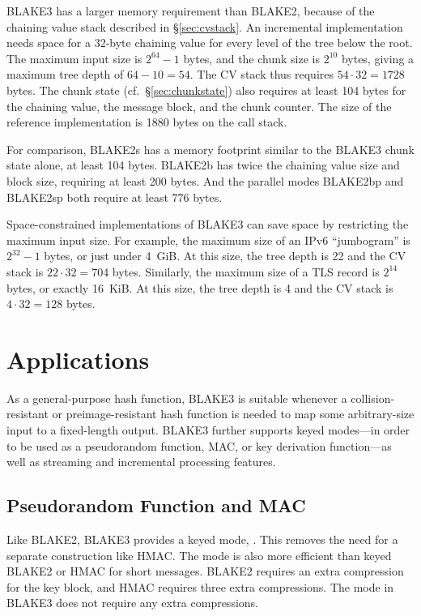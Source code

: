 \documentclass[11pt,notitlepage,a4paper]{article}
\newcommand{\flag}[1]{\texttt{\detokenize{#1}}\xspace}
\begin{document}
BLAKE3 has a larger memory requirement than BLAKE2, because of the chaining
value stack described in \S\ref{sec:cvstack}. An incremental implementation
needs space for a 32-byte chaining value for every level of the tree below the
root. The maximum input size is $2^{64}-1$ bytes, and the chunk size is
$2^{10}$ bytes, giving a maximum tree depth of $64 - 10 = 54$. The CV stack
thus requires $54 \cdot 32 = 1728$ bytes. The chunk state
(cf.~\S\ref{sec:chunkstate}) also requires at least 104 bytes for the chaining
value, the message block, and the chunk counter. The size of the reference
implementation is 1880 bytes on the call stack.

For comparison, BLAKE2s has a memory footprint similar to the BLAKE3 chunk
state alone, at least 104 bytes. BLAKE2b has twice the chaining value size and
block size, requiring at least 200 bytes. And the parallel modes BLAKE2bp and
BLAKE2sp both require at least 776 bytes.

Space-constrained implementations of BLAKE3 can save space by restricting the
maximum input size. For example, the maximum size of an IPv6 ``jumbogram'' is
$2^{32}-1$ bytes, or just under 4~GiB. At this size, the tree depth is 22 and
the CV stack is $22 \cdot 32 = 704$ bytes. Similarly, the maximum size of a TLS
record is $2^{14}$ bytes, or exactly 16~KiB. At this size, the tree depth is 4
and the CV stack is $4 \cdot 32 = 128$ bytes.

\section{Applications}\label{sec:applications}

As a general-purpose hash function, BLAKE3 is suitable whenever a
collision-resistant or preimage-resistant hash function is needed to map
some arbitrary-size input to a fixed-length output.
BLAKE3 further supports keyed modes---in order to be used as a pseudorandom
function, MAC, or key derivation function---as well as streaming and
incremental processing features.

\subsection{Pseudorandom Function and MAC}\label{sec:mac}

Like BLAKE2, BLAKE3 provides a keyed mode, \flag{keyed_hash}. This removes the
need for a separate construction like HMAC. The \flag{keyed_hash} mode is also
more efficient than keyed BLAKE2 or HMAC for short messages. BLAKE2 requires an
extra compression for the key block, and HMAC requires three extra
compressions. The \flag{keyed_hash} mode in BLAKE3 does not require any extra
compressions.
\end{document}
